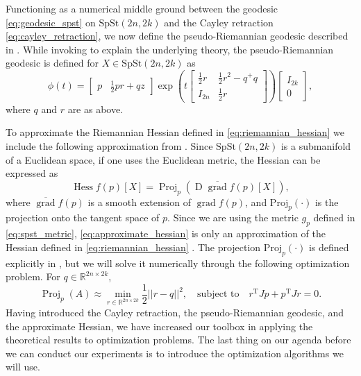 Functioning as a numerical middle ground between the geodesic \eqref{eq:geodesic_spst} on $\mathrm{SpSt}(2n, 2k)$ and the Cayley retraction \eqref{eq:cayley_retraction}, we now define the pseudo-Riemannian geodesic described in \cite[p.~10]{BendokatZimmermann2021}. While invoking \cite{BendokatZimmermann2021} to explain the underlying theory, the pseudo-Riemannian geodesic is defined for $X\in \mathrm{SpSt}(2n, 2k)$ as 
%
\begin{equation*}
\phi(t)=\begin{bmatrix}
p & \frac{1}{2}pr+qz
\end{bmatrix}\exp\left( t\begin{bmatrix}
\frac{1}{2}r  & \frac{1}{2}r^{2}-q^{+}q \\
I_{2n} & \frac{1}{2}r
\end{bmatrix} \right)
\begin{bmatrix}
I_{2k} \\
0
\end{bmatrix},
\end{equation*}
%
where $q$ and $r$ are as above. 

To approximate the Riemannian Hessian defined in \eqref{eq:riemannian_hessian} we include the following approximation from \cite[Corr.~5.16]{Boumal2023}. Since $\mathrm{SpSt}(2n, 2k)$ is a submanifold of a Euclidean space, if one uses the Euclidean metric, the Hessian can be expressed as
%
\begin{equation}\label{eq:approximate_hessian}
\operatorname{Hess}f(p)[X]=\operatorname{Proj}_{p}(\operatorname{D}\overline{\operatorname{grad}}f(p)[X]),
\end{equation}
%
where $\overline{\operatorname{grad}}f(p)$ is a smooth extension of $\operatorname{grad}f(p)$, and $\mathrm{Proj}_{p}(\cdot)$ is the projection onto the tangent space of $p$. Since we are using the metric $g_p$ defined in \eqref{eq:spst_metric}, \eqref{eq:approximate_hessian} is only an approximation of the Hessian defined in \eqref{eq:riemannian_hessian} \cite[p.~11]{JensenZimmermann2024}. The projection $\mathrm{Proj}_{p}(\cdot)$ is defined explicitly in \cite[Lem.~2.3]{JensenZimmermann2024}, but we will solve it numerically through the following optimization problem. For $q\in \mathbb{R}^{2n\times 2k}$,
%
\begin{equation}\label{eq:projection_problem}
\operatorname{Proj}_{p}(A)\approx \operatorname*{min}_{r\in \mathbb{R}^{2n\times2k}} \frac{1}{2}\lvert \lvert r-q \rvert  \rvert ^{2},\quad\text{subject to}\quad r^{\mathrm{T}}Jp+p^{\mathrm{T}}Jr=0.
\end{equation}
%
Having introduced the Cayley retraction, the pseudo-Riemannian geodesic, and the approximate Hessian, we have increased our toolbox in applying the theoretical results to optimization problems. The last thing on our agenda before we can conduct our experiments is to introduce the optimization algorithms we will use. 